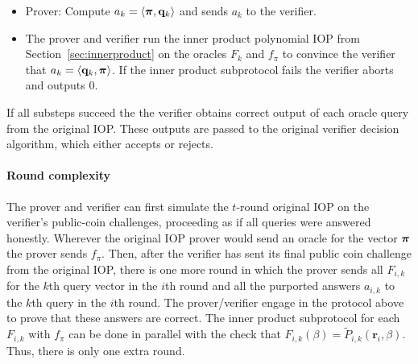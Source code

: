 \begin{itemize}
\begin{itemize}
 
 \item Prover: Compute $a_k = \langle \boldsymbol{\pi}, \mathbf{q}_k \rangle$ and sends $a_k$ to the verifier. 
 
 \item The prover and verifier run the inner product polynomial IOP from Section~\ref{sec:innerproduct} on the oracles $F_k$ and $f_\pi$ to convince the verifier that $a_k = \langle \mathbf{q}_k, \boldsymbol{\pi} \rangle$. If the inner product subprotocol fails the verifier aborts and outputs 0.  
 \end{itemize}
\end{itemize}

If all substeps succeed the the verifier obtains correct output of each oracle query from the original IOP. These outputs are passed to the original verifier decision algorithm, which either accepts or rejects. 

\paragraph{Round complexity} The prover and verifier can first simulate the $t$-round original IOP  on the verifier's public-coin challenges, proceeding as if all queries were answered honestly. Wherever the original IOP prover would send an oracle for the vector $\boldsymbol{\pi}$ the prover sends $f_\pi$. Then, after the verifier has sent its final public coin challenge from the original IOP, there is one more round in which the prover sends all $F_{i, k}$ for the $k$th query vector in the $i$th round and all the purported answers $a_{i, k}$ to the $k$th query in the $i$th round. The prover/verifier engage in the protocol above to prove that these answers are correct. The inner product subprotocol for each $F_{i,k}$ with $f_\pi$ can be done in parallel with the check that $F_{i,k}(\beta) = \tilde{P}_{i,k}(\mathbf{r}_i, \beta)$. Thus, there is only one extra round.    


